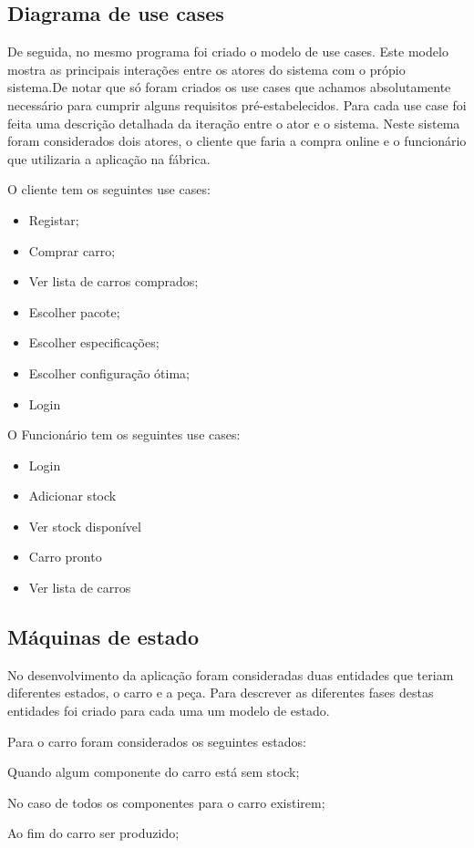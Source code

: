 \documentclass[10pt, a4paper]{article}
\begin{document}
\subsection{Diagrama de use cases}
De seguida, no mesmo programa foi criado o modelo de use cases. Este modelo mostra as principais interações entre os atores do sistema com o própio sistema.De notar que só foram criados os use cases que achamos absolutamente necessário para cumprir alguns requisitos pré-estabelecidos. Para cada use case foi feita uma descrição detalhada da iteração entre o ator e o sistema. Neste sistema foram considerados dois atores, o cliente que faria a compra online e o funcionário que utilizaria a aplicação na fábrica.

O cliente tem os seguintes use cases:
\begin{itemize}
\item Registar;
\item Comprar carro;
\item Ver lista de carros comprados;
\item Escolher pacote;
\item Escolher especificações;
\item Escolher configuração ótima;
\item Login
\end{itemize}
O Funcionário tem os seguintes use cases:
\begin{itemize}
\item Login
\item Adicionar stock
\item Ver stock disponível
\item Carro pronto
\item Ver lista de carros
\end{itemize}

\subsection{Máquinas de estado}
No desenvolvimento da aplicação foram consideradas duas entidades que teriam diferentes estados, o carro e a peça. Para descrever as diferentes fases destas entidades foi criado para cada uma um modelo de estado.

Para o carro foram considerados os seguintes estados:
\begin{description}[align=left]
\item [Em espera] Quando algum componente do carro está sem stock;
\item [Em produção] No caso de todos os componentes para o carro existirem;
\item [Pronto] Ao fim do carro ser produzido;
\end{description}
\end{document}
